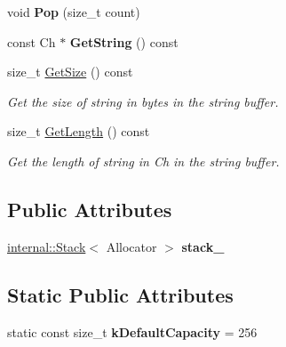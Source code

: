 \begin{DoxyCompactItemize}
void {\bfseries Pop} (size\+\_\+t count)
\item 
\mbox{\label{class_generic_string_buffer_ab06b8c5f1385bd3dfd4caea8b7510f0b}} 
const Ch $\ast$ {\bfseries Get\+String} () const
\item 
\mbox{\label{class_generic_string_buffer_a725e862b9a78375f5363b0b61ad789f3}} 
size\+\_\+t \hyperlink{class_generic_string_buffer_a725e862b9a78375f5363b0b61ad789f3}{Get\+Size} () const
\begin{DoxyCompactList}\small\item\em Get the size of string in bytes in the string buffer. \end{DoxyCompactList}\item 
\mbox{\label{class_generic_string_buffer_ad324b8154be3354dda3aa4a0a7361499}} 
size\+\_\+t \hyperlink{class_generic_string_buffer_ad324b8154be3354dda3aa4a0a7361499}{Get\+Length} () const
\begin{DoxyCompactList}\small\item\em Get the length of string in Ch in the string buffer. \end{DoxyCompactList}\end{DoxyCompactItemize}
\subsection*{Public Attributes}
\begin{DoxyCompactItemize}
\item 
\mbox{\label{class_generic_string_buffer_aaef716643febb9de5957dbf8ff904409}} 
\hyperlink{classinternal_1_1_stack}{internal\+::\+Stack}$<$ Allocator $>$ {\bfseries stack\+\_\+}
\end{DoxyCompactItemize}
\subsection*{Static Public Attributes}
\begin{DoxyCompactItemize}
\item 
\mbox{\label{class_generic_string_buffer_ae74f9df854dd5a7db4315ef44b016d22}} 
static const size\+\_\+t {\bfseries k\+Default\+Capacity} = 256
\end{DoxyCompactItemize}


